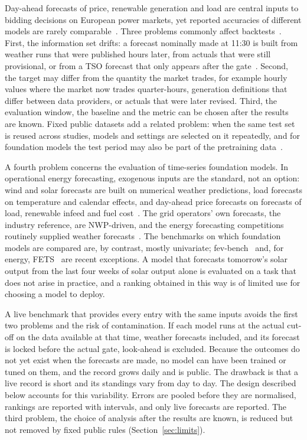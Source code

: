 \documentclass[11pt,a4paper]{article}
\begin{document}
Day-ahead forecasts of price, renewable generation and load are central inputs to bidding decisions on European
power markets, yet reported accuracies of different models are rarely comparable~\cite{lago,hewamalage}. Three problems
commonly affect backtests~\cite{hewamalage}. First, the information set drifts: a forecast nominally made at 11:30 is built from weather runs that
were published hours later, from actuals that were still provisional, or from a TSO forecast that only appears after
the gate~\cite{energyarena}. Second, the target may differ from the quantity the market trades, for example hourly values where the
market now trades quarter-hours, generation definitions that differ between data providers, or actuals that were later
revised. Third, the evaluation window, the baseline and the metric can be chosen after the results are known. Fixed
public datasets add a related problem: when the same test set is reused across studies, models and settings are
selected on it repeatedly, and for foundation models the test period may also be part of the pretraining
data~\cite{meyerleak,impermanent}.

A fourth problem concerns the evaluation of time-series foundation models. In operational energy forecasting, exogenous inputs are
the standard, not an option: wind and solar forecasts are built on numerical weather predictions, load forecasts on
temperature and calendar effects, and day-ahead price forecasts on forecasts of load, renewable infeed and fuel
cost~\cite{hongreview,weron,lago}. The grid operators' own forecasts, the industry reference, are NWP-driven, and the
energy forecasting competitions routinely supplied weather forecasts~\cite{gefcom}. The benchmarks on which
foundation models are compared are, by contrast, mostly univariate; fev-bench~\cite{fevbench} and, for energy,
FETS~\cite{fets} are recent exceptions. A model that forecasts tomorrow's solar output from
the last four weeks of solar output alone is evaluated on a task that does not arise in practice, and a ranking
obtained in this way is of limited use for choosing a model to deploy.

A live benchmark that provides every entry with the same inputs avoids the first two problems and the risk of contamination. If each
model runs at the actual cut-off on the data available at that time, weather forecasts included, and its forecast is
locked before the actual gate, look-ahead is excluded. Because the outcomes do not yet exist when the forecasts are
made, no model can have been trained or tuned on them, and the record grows daily and is public. The drawback is
that a live record is short and its standings vary from day to day. The design described below accounts for this
variability. Errors are pooled before they are normalised, rankings are reported with intervals, and only live
forecasts are reported. The third problem, the choice of analysis after the results are known, is reduced but not
removed by fixed public rules (Section~\ref{sec:limits}).
\end{document}
